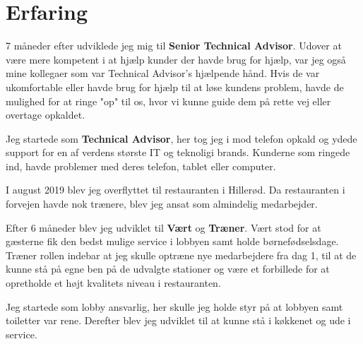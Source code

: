 \documentclass[]{plushcv}
\begin{document}
%
%


%
%

\begin{minipage}[t]{0.70\textwidth} 



\section{Erfaring}
\vspace{\topsep} %
\begin{tightemize}
\sectionsep
\item 7 måneder efter udviklede jeg mig til \textbf{Senior Technical Advisor}. Udover at være mere kompetent i at hjælp kunder der havde brug for hjælp, var jeg også mine kollegaer som var Technical Advisor's hjælpende hånd. Hvis de var ukomfortable eller havde brug for hjælp til at løse kundens problem, havde de mulighed for at ringe "op" til os, hvor vi kunne guide dem på rette vej eller overtage opkaldet.
\item Jeg startede som \textbf{Technical Advisor}, her tog jeg i mod telefon opkald og ydede support for en af verdens største IT og teknoligi brands. Kunderne som ringede ind, havde problemer med deres telefon, tablet eller computer.
\end{tightemize}
\sectionsep

\begin{tightemize}
\sectionsep
\item I august 2019 blev jeg overflyttet til restauranten i Hillerød. Da restauranten i forvejen havde nok trænere, blev jeg ansat som almindelig medarbejder.
\item Efter 6 måneder blev jeg udviklet til \textbf{Vært} og \textbf{Træner}. Vært stod for at gæsterne fik den bedst mulige service i lobbyen samt holde børnefødselsdage. Træner rollen indebar at jeg skulle optræne nye medarbejdere fra dag 1, til at de kunne stå på egne ben på de udvalgte stationer og være et forbillede for at opretholde et højt kvalitets niveau i restauranten.
\item Jeg startede som lobby ansvarlig, her skulle jeg holde styr på at lobbyen samt toiletter var rene. Derefter blev jeg udviklet til at kunne stå i køkkenet og ude i service.
\end{tightemize}
\sectionsep



\end{minipage}
\end{document}
